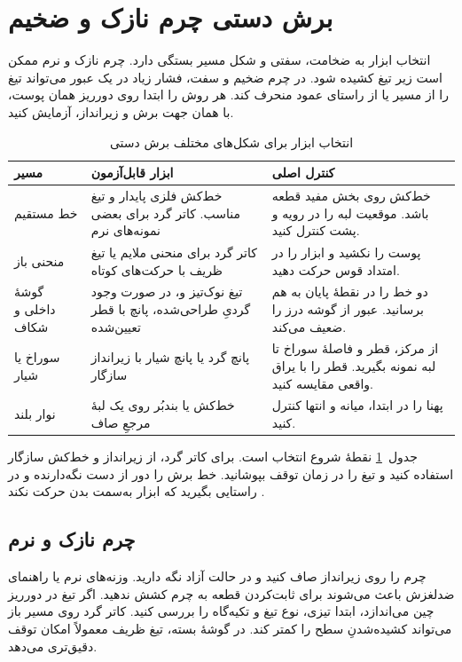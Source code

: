 \section{برش دستی چرم نازک و ضخیم}

انتخاب ابزار به ضخامت، سفتی و شکل مسیر بستگی دارد. چرم نازک و نرم ممکن است زیر تیغ کشیده شود. در چرم ضخیم و سفت، فشار زیاد در یک عبور می‌تواند تیغ را از مسیر یا از راستای عمود منحرف کند. هر روش را ابتدا روی دورریز همان پوست، با همان جهت برش و زیرانداز، آزمایش کنید.

\begin{table}[!htbp]
  \centering
  \caption{انتخاب ابزار برای شکل‌های مختلف برش دستی}
  \label{tab:tools}
  \begin{tabular}{@{}p{30mm}p{52mm}p{64mm}@{}}
    \toprule
    مسیر & ابزار قابل‌آزمون & کنترل اصلی \\
    \midrule
    خط مستقیم & خط‌کش فلزی پایدار و تیغ مناسب. کاتر گرد برای بعضی نمونه‌های نرم & خط‌کش روی بخش مفید قطعه باشد. موقعیت لبه را در رویه و پشت کنترل کنید. \\
    منحنی باز & کاتر گرد برای منحنی ملایم یا تیغ ظریف با حرکت‌های کوتاه & پوست را نکشید و ابزار را در امتداد قوس حرکت دهید. \\
    گوشۀ داخلی و شکاف & تیغ نوک‌تیز و، در صورت وجود گردیِ طراحی‌شده، پانچ با قطر تعیین‌شده & دو خط را در نقطۀ پایان به هم برسانید. عبور از گوشه درز را ضعیف می‌کند. \\
    سوراخ یا شیار & پانچ گرد یا پانچ شیار با زیرانداز سازگار & از مرکز، قطر و فاصلۀ سوراخ تا لبه نمونه بگیرید. قطر را با یراق واقعی مقایسه کنید. \\
    نوار بلند & خط‌کش یا بندبُر روی یک لبۀ مرجعِ صاف & پهنا را در ابتدا، میانه و انتها کنترل کنید. \\
    \bottomrule
  \end{tabular}
\end{table}

جدول~\ref{tab:tools} نقطۀ شروع انتخاب است. برای کاتر گرد، از زیرانداز و خط‌کش سازگار استفاده کنید و تیغ را در زمان توقف بپوشانید. خط برش را دور از دست نگه‌دارنده و در راستایی بگیرید که ابزار به‌سمت بدن حرکت نکند \cite{olfa}.

\subsection{چرم نازک و نرم}

چرم را روی زیرانداز صاف کنید و در حالت آزاد نگه دارید. وزنه‌های نرم یا راهنمای ضدلغزش باعث می‌شوند برای ثابت‌کردن قطعه به چرم کشش ندهید. اگر تیغ در دورریز چین می‌اندازد، ابتدا تیزی، نوع تیغ و تکیه‌گاه را بررسی کنید. کاتر گرد روی مسیر باز می‌تواند کشیده‌شدنِ سطح را کمتر کند. در گوشۀ بسته، تیغ ظریف معمولاً امکان توقف دقیق‌تری می‌دهد.

